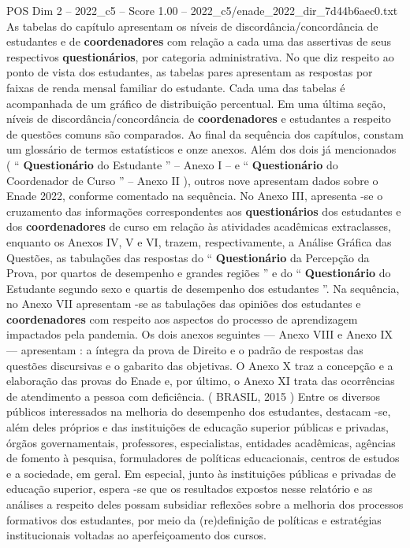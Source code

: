 \begin{textsample}{POS Dim 2 – 2022\_c5 – Score 1.00 – 2022\_c5/enade\_2022\_dir\_7d44b6aec0.txt}
As tabelas do capítulo apresentam os níveis de discordância/concordância de estudantes e de \textbf{coordenadores} com relação a cada uma das assertivas de seus respectivos \textbf{questionários}, por categoria administrativa.
No que diz respeito ao ponto de vista dos estudantes, as tabelas pares apresentam as respostas por faixas de renda mensal familiar do estudante.
Cada uma das tabelas é acompanhada de um gráfico de distribuição percentual.
Em uma última seção, níveis de discordância/concordância de \textbf{coordenadores} e estudantes a respeito de questões comuns são comparados.
Ao final da sequência dos capítulos, constam um glossário de termos estatísticos e onze anexos.
Além dos dois já mencionados ( “ \textbf{Questionário} do Estudante ” – Anexo I – e “ \textbf{Questionário} do Coordenador de Curso ” – Anexo II ), outros nove apresentam dados sobre o Enade 2022, conforme comentado na sequência.
No Anexo III, apresenta -se o cruzamento das informações correspondentes aos \textbf{questionários} dos estudantes e dos \textbf{coordenadores} de curso em relação às atividades acadêmicas extraclasses, enquanto os Anexos IV, V e VI, trazem, respectivamente, a Análise Gráfica das Questões, as tabulações das respostas do “ \textbf{Questionário} da Percepção da Prova, por quartos de desempenho e grandes regiões ” e do “ \textbf{Questionário} do Estudante segundo sexo e quartis de desempenho dos estudantes ”.
Na sequência, no Anexo VII apresentam -se as tabulações das opiniões dos estudantes e \textbf{coordenadores} com respeito aos aspectos do processo de aprendizagem impactados pela pandemia.
Os dois anexos seguintes — Anexo VIII e Anexo IX — apresentam : a íntegra da prova de Direito e o padrão de respostas das questões discursivas e o gabarito das objetivas.
O Anexo X traz a concepção e a elaboração das provas do Enade e, por último, o Anexo XI trata das ocorrências de atendimento a pessoa com deficiência. ( BRASIL, 2015 ) Entre os diversos públicos interessados na melhoria do desempenho dos estudantes, destacam -se, além deles próprios e das instituições de educação superior públicas e privadas, órgãos governamentais, professores, especialistas, entidades acadêmicas, agências de fomento à pesquisa, formuladores de políticas educacionais, centros de estudos e a sociedade, em geral.
Em especial, junto às instituições públicas e privadas de educação superior, espera -se que os resultados expostos nesse relatório e as análises a respeito deles possam subsidiar reflexões sobre a melhoria dos processos formativos dos estudantes, por meio da (re)definição de políticas e estratégias institucionais voltadas ao aperfeiçoamento dos cursos.

\end{textsample}
